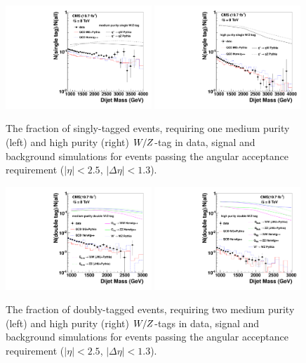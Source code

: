 \begin{figure}[htb]
\begin{center}
\includegraphics[width=0.49\textwidth]{EXO-12-024/figs/signal-acc-eff/single-tagging-eff-medium.pdf}
\includegraphics[width=0.49\textwidth]{EXO-12-024/figs/signal-acc-eff/single-tagging-eff.pdf}
\end{center}
\caption{The fraction of singly-tagged events, requiring one medium purity (left) 
  and high purity (right) $W/Z$-tag in data,
  signal and background simulations for events passing the angular acceptance
  requirement ($|\eta| < 2.5$, $|\Delta\eta|<1.3$).}
\label{fig:singleefficiencies}
\end{figure}

\begin{figure}[htb]
\begin{center}
\includegraphics[width=0.49\textwidth]{EXO-12-024/figs/signal-acc-eff/double-tagging-eff-medium.pdf}
\includegraphics[width=0.49\textwidth]{EXO-12-024/figs/signal-acc-eff/double-tagging-eff.pdf}
\end{center}
\caption{The fraction of doubly-tagged events, requiring two medium purity (left) 
and high purity (right) $W/Z$-tags in data,
  signal and background simulations for events passing the angular acceptance
  requirement ($|\eta| < 2.5$, $|\Delta\eta|<1.3$).}
\label{fig:doubleefficiencies}
\end{figure}
%


